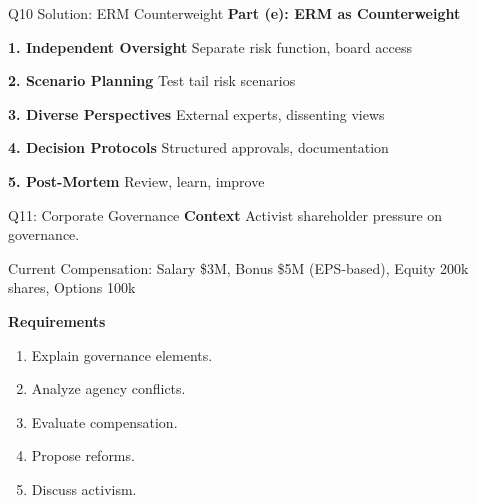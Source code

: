 \documentclass[aspectratio=169,10pt]{beamer}
\renewcommand{\small}{\fontsize{6pt}{7.5pt}\selectfont}
\renewcommand{\large}{\fontsize{8pt}{10pt}\selectfont}
\newcommand{\question}[1]{{\large\bfseries\color{crimson}#1}}
\begin{document}
	\begin{frame}{Q10 Solution: ERM Counterweight}
		\question{Part (e): ERM as Counterweight}
		\small
		
		\textbf{1. Independent Oversight}
		Separate risk function, board access
		
		\vspace{0.1cm}
		\textbf{2. Scenario Planning}
		Test tail risk scenarios
		
		\vspace{0.1cm}
		\textbf{3. Diverse Perspectives}
		External experts, dissenting views
		
		\vspace{0.1cm}
		\textbf{4. Decision Protocols}
		Structured approvals, documentation
		
		\vspace{0.1cm}
		\textbf{5. Post-Mortem}
		Review, learn, improve
	\end{frame}
	
	\begin{frame}{Q11: Corporate Governance}
		\question{Context}
		\small
		Activist shareholder pressure on governance.
		
		\vspace{0.1cm}
		Current Compensation: Salary \$3M, Bonus \$5M (EPS-based), Equity 200k shares, Options 100k
		
		\vspace{0.1cm}
		\question{Requirements}
		\begin{enumerate}
			\item Explain governance elements.
			\item Analyze agency conflicts.
			\item Evaluate compensation.
			\item Propose reforms.
			\item Discuss activism.
		\end{enumerate}
	\end{frame}
	
\end{document}
